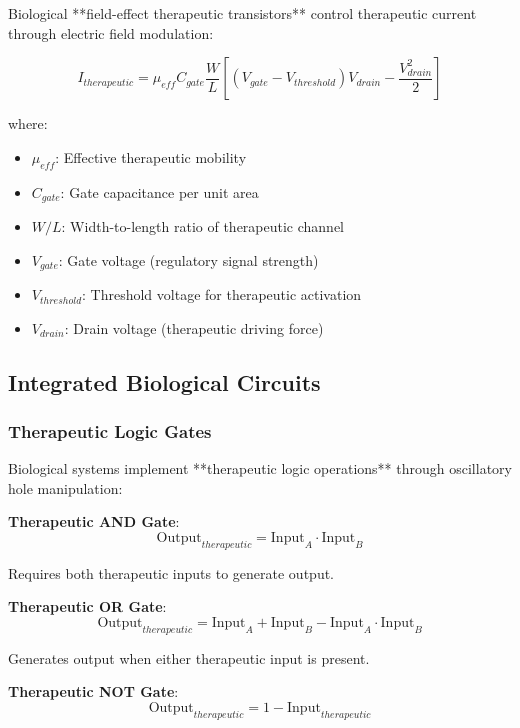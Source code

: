 Biological **field-effect therapeutic transistors** control therapeutic current through electric field modulation:

\begin{equation}
I_{therapeutic} = \mu_{eff} C_{gate} \frac{W}{L} \left[(V_{gate} - V_{threshold})V_{drain} - \frac{V_{drain}^2}{2}\right]
\end{equation}

where:
\begin{itemize}
\item $\mu_{eff}$: Effective therapeutic mobility
\item $C_{gate}$: Gate capacitance per unit area
\item $W/L$: Width-to-length ratio of therapeutic channel
\item $V_{gate}$: Gate voltage (regulatory signal strength)
\item $V_{threshold}$: Threshold voltage for therapeutic activation
\item $V_{drain}$: Drain voltage (therapeutic driving force)
\end{itemize}

\subsection{Integrated Biological Circuits}

\subsubsection{Therapeutic Logic Gates}

Biological systems implement **therapeutic logic operations** through oscillatory hole manipulation:

\textbf{Therapeutic AND Gate}:
\begin{equation}
\text{Output}_{therapeutic} = \text{Input}_A \cdot \text{Input}_B
\end{equation}

Requires both therapeutic inputs to generate output.

\textbf{Therapeutic OR Gate}:
\begin{equation}
\text{Output}_{therapeutic} = \text{Input}_A + \text{Input}_B - \text{Input}_A \cdot \text{Input}_B
\end{equation}

Generates output when either therapeutic input is present.

\textbf{Therapeutic NOT Gate}:
\begin{equation}
\text{Output}_{therapeutic} = 1 - \text{Input}_{therapeutic}
\end{equation}

